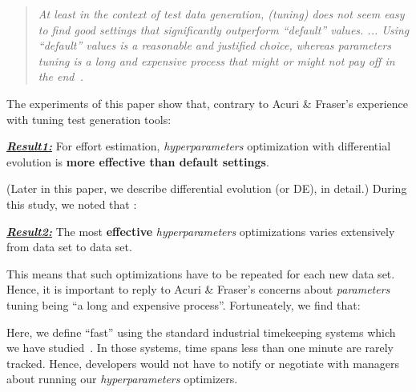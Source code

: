 \documentclass[10pt,conference]{IEEEtran}
\newenvironment{result}[2]
{\begin{myshadowbox}\textbf{\textit{\underline{Result#1:}}} #2}{ 
\end{myshadowbox}}
\begin{document}
\begin{quote}
{\em At least in the context of test data generation, (tuning) does not seem easy to find good settings that significantly outperform   ``default'' {\em values}. ... Using ``default'' {\em values} is a reasonable and justified choice, whereas {\em parameters} tuning is a long and expensive process that might or might not pay off in the end~\cite{Arcuri2013}.}
\end{quote}
The experiments of this paper show that, contrary to Acuri \& Fraser's experience with tuning test generation tools:
\begin{result}{1}
For effort estimation, {\em hyperparameters} optimization  with differential evolution\cite{storn1997differential}  is {\bf more effective than  default settings}. 
\end{result}
(Later in this paper, we describe differential evolution (or DE), in detail.)
During this study, we noted that : 
\begin{result}{2}
The most {\bf effective} {\em hyperparameters} optimizations varies extensively from data set to data set.
\end{result}
This means that  such optimizations have to be repeated for each new data set. Hence, it is important
to reply to  Acuri \& Fraser's concerns about {\em parameters} tuning being
``a long and expensive process''. Fortuneately, we find that:


Here, we define  ``fast'' using the   standard industrial timekeeping
systems which we have studied~\cite{Menzies2016AreDI}. In those systems, time spans less than one minute
are rarely tracked. Hence, developers would not have to notify or negotiate with   managers about running
our {\em hyperparameters} optimizers.
\end{document}
